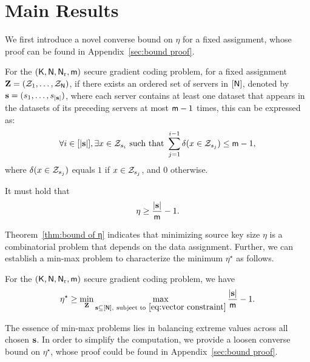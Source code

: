 \documentclass[conference,letterpaper]{IEEEtran}
\begin{document}
\section{Main Results}
\label{sec:main}
We first introduce a novel converse bound on $ \eta $ for a fixed assignment, whose proof can be found in Appendix~\ref{sec:bound proof}.
\begin{thm}
\label{thm:bound of η}
For the $({\sf K},{\sf N},{\sf N}_{\rm r}, {\sf m})$ secure gradient coding problem, for a fixed assignment \(\mathbf{Z} = ({\cal Z}_1, \ldots, {\cal Z}_{{\sf N}})\), if there exists an ordered set of servers in \([{\sf N}]\), denoted by \({\bf s} = (s_1, \ldots, s_{|{\bf s}|})\), where each server contains at least one dataset that appears in the datasets of its preceding servers at most \({\sf m} - 1\) times, this can be expressed as:
\begin{align}
\forall i \in [|{\bf s}|], \exists x \in {\cal Z}_{s_i} \text{ such that } \sum_{j=1}^{i-1} \delta(x \in {\cal Z}_{s_j}) \leq {\sf m} - 1, \label{eq:vector constraint}
\end{align}
where \(\delta(x \in {\cal Z}_{s_j})\) equals \(1\) if \(x \in {\cal Z}_{s_j}\), and \(0\) otherwise.

It must hold that
\begin{align}
\eta \geq \frac{|{\bf s}|}{{\sf m}}-1. \label{eq:converse lemma}
\end{align}
\end{thm}
Theorem~\ref{thm:bound of η} indicates that minimizing source key size $\eta$ is a combinatorial problem that depends on the data assignment. 
Further, we can establish a min-max problem to characterize the minimum $\eta^{\star}$ as follows.
\begin{cor}
    For the $({\sf K},{\sf N},{\sf N}_{\rm r}, {\sf m})$ secure gradient coding problem, we have
    \begin{align}
\eta^{\star} \geq \min_{\mathbf{Z}}
\max_{{\bf s} \subseteq [{\sf N}], ~\text{subject to}~ \eqref{eq:vector constraint} } \frac{|{\bf s}|}{{\sf m}}-1. \label{eq:converse lemma}
\end{align}
\end{cor}

The essence of min-max problems lies in balancing extreme values across all chosen ${\bf s}$.%
 In order to simplify the computation, we provide a loosen converse bound on $\eta^{\star}$, whose proof could be found in Appendix~\ref{sec:bound proof}.
\end{document}

